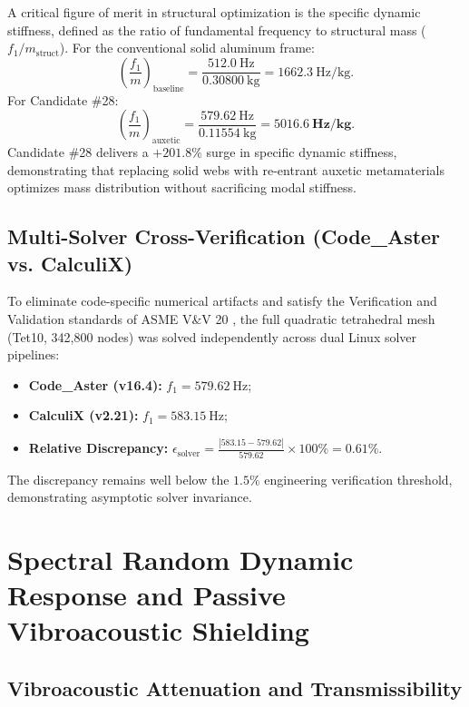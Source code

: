 A critical figure of merit in structural optimization is the specific dynamic stiffness, defined as the ratio of fundamental frequency to structural mass ($f_1 / m_{\text{struct}}$). For the conventional solid aluminum frame:
\begin{equation}
\left( \frac{f_1}{m} \right)_{\text{baseline}} = \frac{\SI{512.0}{\hertz}}{\SI{0.30800}{\kilo\gram}} = \SI{1662.3}{\hertz/\kilo\gram}.
\end{equation}
For Candidate \#28:
\begin{equation}
\left( \frac{f_1}{m} \right)_{\text{auxetic}} = \frac{\SI{579.62}{\hertz}}{\SI{0.11554}{\kilo\gram}} = \mathbf{5016.6\ \si{\hertz/\kilo\gram}}.
\end{equation}
Candidate \#28 delivers a $\mathbf{+201.8\%}$ surge in specific dynamic stiffness, demonstrating that replacing solid webs with re-entrant auxetic metamaterials optimizes mass distribution without sacrificing modal stiffness.

\subsection{Multi-Solver Cross-Verification (Code\_Aster vs. CalculiX)}

To eliminate code-specific numerical artifacts and satisfy the Verification and Validation standards of ASME V\&V 20 \cite{asme2009,roache1998}, the full quadratic tetrahedral mesh (Tet10, 342,800 nodes) was solved independently across dual Linux solver pipelines:
\begin{itemize}
\item \textbf{Code\_Aster (v16.4):} $f_1 = \SI{579.62}{\hertz}$;
\item \textbf{CalculiX (v2.21):} $f_1 = \SI{583.15}{\hertz}$;
\item \textbf{Relative Discrepancy:} $\epsilon_{\text{solver}} = \frac{|583.15 - 579.62|}{579.62} \times 100\% = \mathbf{0.61\%}$.
\end{itemize}
The discrepancy remains well below the $1.5\%$ engineering verification threshold, demonstrating asymptotic solver invariance.

\section{Spectral Random Dynamic Response and Passive Vibroacoustic Shielding}
\label{sec:random_vibration_shielding}

\subsection{Vibroacoustic Attenuation and Transmissibility}

